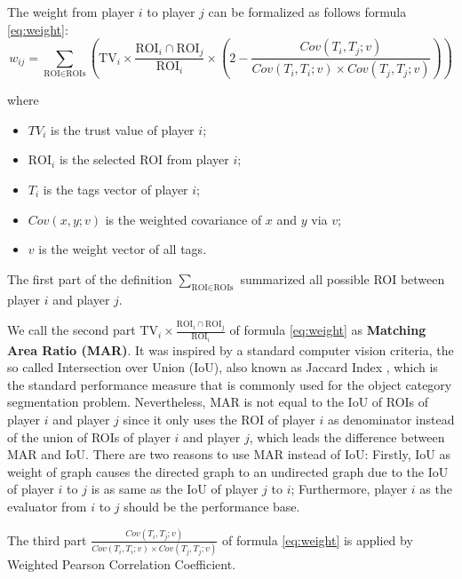 \begin{definition}
The weight from player $i$ to player $j$ can be formalized as follows formula \ref{eq:weight}:
\begin{equation}
\label{eq:weight}
w_{ij} = 
\sum_{\text{ROI}\in\text{ROIs}}{\left(
  \text{TV}_i \times
  \frac{\text{ROI}_i\cap\text{ROI}_j}{\text{ROI}_i}\times
  \left( 2-\frac{Cov(T_i, T_j; v)}
      {Cov(T_i, T_i; v)\times Cov(T_j, T_j; v)} \right)\right)
}
\end{equation}

where 

\begin{itemize}
  \item $TV_i$ is the trust value of player $i$;
  \item $\text{ROI}_i$ is the selected ROI from player $i$;
  \item $T_i$ is the tags vector of player $i$;
  \item $Cov(x, y; v)$ is the weighted covariance of $x$ and $y$ via $v$;
  \item $v$ is the weight vector of all tags.
\end{itemize}
\end{definition}

The first part of the definition $\sum_{\text{ROI}\in\text{ROIs}}$ summarized all possible 
ROI between player $i$ and player $j$. 

We call the second part $\text{TV}_i \times \frac{\text{ROI}_i\cap\text{ROI}_j}{\text{ROI}_i}$ 
of formula \ref{eq:weight} as \textbf{Matching Area Ratio (MAR)}. 
It was inspired by a standard computer vision criteria,
the so called Intersection over Union (IoU), also known as Jaccard Index \cite{real1996probabilistic},
which is the standard performance measure that is commonly used for the object category segmentation problem.
Nevertheless, MAR is not equal to the IoU of ROIs of player $i$  and 
player $j$ since it only uses the ROI of player $i$ as denominator instead of 
the union of ROIs of player $i$ and player $j$, which leads the difference between MAR and IoU. 
There are two reasons to use MAR instead of IoU:
Firstly, IoU as weight of graph causes the directed graph to an undirected graph due to 
the IoU of player $i$ to $j$ is as same as the IoU of player $j$ to $i$; Furthermore, 
player $i$ as the evaluator from $i$ to $j$ should be the performance base.

The third part $\frac{Cov(T_i, T_j; v)}{Cov(T_i, T_i; v)\times Cov(T_j, T_j; v)}$
of formula \ref{eq:weight} is applied by Weighted Pearson Correlation Coefficient.

